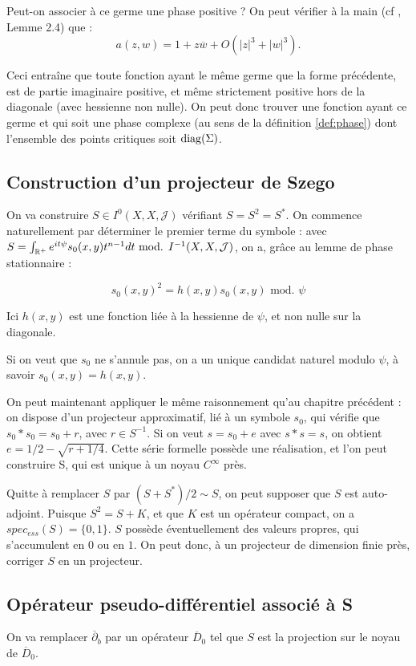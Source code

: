 Peut-on associer à ce germe une phase positive ? On peut vérifier à la main (cf \cite{Shiffman2002}, Lemme 2.4) que :
\begin{equation*}
	a(z,w) = 1 + z\overline{w} + O(|z|^3 + |w|^3).
\end{equation*}

Ceci entraîne que toute fonction ayant le même germe que la forme
précédente, est de partie imaginaire positive, et même strictement
positive hors de la diagonale (avec hessienne non nulle). On peut donc
trouver une fonction ayant ce germe et qui soit une phase complexe (au
sens de la définition \ref{def:phase}) dont l'ensemble des points
critiques soit $\operatorname{diag}(\Sigma)$.
\subsection{Construction d'un projecteur de Szego}

On va construire $S \in I^0(X,X,\mathcal{J})$ vérifiant $S =S^2 = S^*$. On commence naturellement par déterminer le premier terme du symbole : avec $S = \int_{\mathbb{R}^+}e^{it\psi}s_0(x,y)t^{n-1}dt \text{ mod. } I^{-1}(X,X,\mathcal{J})$, on a, grâce au lemme de phase stationnaire :

\begin{equation*}
	s_0(x,y)^2= h(x,y)s_0(x,y) \text{ mod. } \psi
\end{equation*}

Ici $h(x,y)$ est une fonction liée à la hessienne de $\psi$, et non nulle sur la diagonale.

Si on veut que $s_0$ ne s'annule pas, on a un unique candidat naturel modulo $\psi$, à savoir $s_0(x,y)= h(x,y)$.

On peut maintenant appliquer le même raisonnement qu'au chapitre précédent : on dispose d'un projecteur approximatif, lié à un symbole $s_0$, qui vérifie que $s_0 * s_0 = s_0 +r$, avec $r \in S^{-1}$. Si on veut $s=s_0 + e$ avec $s * s = s$, on obtient $e = 1/2 - \sqrt{r + 1/4}$. Cette série formelle possède une réalisation, et l'on peut construire S, qui est unique à un noyau $C^{\infty}$ près.

Quitte à remplacer $S$ par $(S+S^*)/2 \sim S$, on peut supposer que $S$ est auto-adjoint. Puisque $S^2=S+K$, et que $K$ est un opérateur compact, on a $spec_{ess}(S)=\{0,1\}$. $S$ possède éventuellement des valeurs propres, qui s'accumulent en $0$ ou en $1$. On peut donc, à un projecteur de dimension finie près, corriger $S$ en un projecteur.

\subsection{Opérateur  pseudo-différentiel associé à S}
On va remplacer $\overline{\partial}_b$ par un opérateur $\overline{D}_0$ tel que $S$ est la projection sur le noyau de $\overline{D}_0$. 

